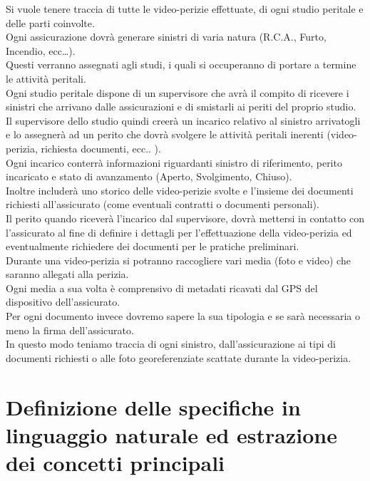 \documentclass[a4paper,12pt]{report}
\begin{document}
Si vuole tenere traccia di tutte le video-perizie effettuate, di ogni studio peritale e delle parti coinvolte. 
\\
Ogni assicurazione dovrà generare sinistri di varia natura (R.C.A., Furto, Incendio, ecc…).
\\
Questi verranno assegnati agli studi, i quali si occuperanno di portare a termine le attività peritali.
\\
Ogni studio peritale dispone di un supervisore che avrà il compito di ricevere i sinistri che arrivano dalle assicurazioni e di smistarli ai periti del proprio studio.
\\
Il supervisore dello studio quindi creerà un incarico relativo al sinistro arrivatogli e lo assegnerà ad un perito che dovrà svolgere le attività peritali inerenti (video-perizia, richiesta documenti, ecc.. ).
\\
Ogni incarico conterrà informazioni riguardanti sinistro di riferimento, perito incaricato e stato di avanzamento (Aperto, Svolgimento, Chiuso).
\\
Inoltre includerà uno storico delle video-perizie svolte e  l’insieme dei documenti richiesti all’assicurato (come eventuali contratti o documenti personali).
\\
Il perito quando riceverà l'incarico dal supervisore, dovrà mettersi in contatto con l'assicurato al fine di definire i dettagli per l'effettuazione della video-perizia ed eventualmente richiedere dei documenti per le pratiche preliminari.
\\
Durante una video-perizia si potranno raccogliere vari media (foto e video) che saranno allegati alla perizia.
\\
Ogni media a sua volta è comprensivo di metadati ricavati dal GPS del dispositivo dell’assicurato.
\\
Per ogni documento invece dovremo sapere la sua tipologia e se sarà necessaria o meno la firma dell’assicurato.
\\
In questo modo teniamo traccia di ogni sinistro, dall’assicurazione ai tipi di documenti richiesti o alle foto georeferenziate scattate durante la video-perizia.


\section{Definizione delle specifiche in linguaggio naturale ed estrazione dei concetti principali}
\end{document}

